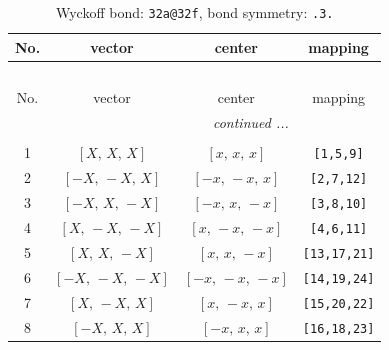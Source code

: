 \documentclass[fleqn,8pt]{jsarticle}
\begin{document}
\begin{longtable}{cccc}
\caption{Wyckoff bond: {\tt 32a@32f}, bond symmetry: {\tt .3.}}
 \\
 \hline \hline
No. & vector & center & mapping \\ \hline \endfirsthead

\multicolumn{3}{l}{\tablename\ \thetable{}} \\
 \hline \hline
No. & vector & center & mapping \\ \hline \endhead

 \hline \hline
\multicolumn{3}{r}{\footnotesize\it continued ...} \\ \endfoot

 \hline \hline
\multicolumn{3}{r}{} \\ \endlastfoot

1 & $\left[ X,\, X,\, X \right]$ & $\left[ x,\, x,\, x \right]$ & {\tt [1,5,9]} \\ \hline
2 & $\left[ - X,\, - X,\, X \right]$ & $\left[ - x,\, - x,\, x \right]$ & {\tt [2,7,12]} \\ \hline
3 & $\left[ - X,\, X,\, - X \right]$ & $\left[ - x,\, x,\, - x \right]$ & {\tt [3,8,10]} \\ \hline
4 & $\left[ X,\, - X,\, - X \right]$ & $\left[ x,\, - x,\, - x \right]$ & {\tt [4,6,11]} \\ \hline
5 & $\left[ X,\, X,\, - X \right]$ & $\left[ x,\, x,\, - x \right]$ & {\tt [13,17,21]} \\ \hline
6 & $\left[ - X,\, - X,\, - X \right]$ & $\left[ - x,\, - x,\, - x \right]$ & {\tt [14,19,24]} \\ \hline
7 & $\left[ X,\, - X,\, X \right]$ & $\left[ x,\, - x,\, x \right]$ & {\tt [15,20,22]} \\ \hline
8 & $\left[ - X,\, X,\, X \right]$ & $\left[ - x,\, x,\, x \right]$ & {\tt [16,18,23]} \\
\end{longtable}
\renewcommand{\arraystretch}{1.2}
\end{document}
